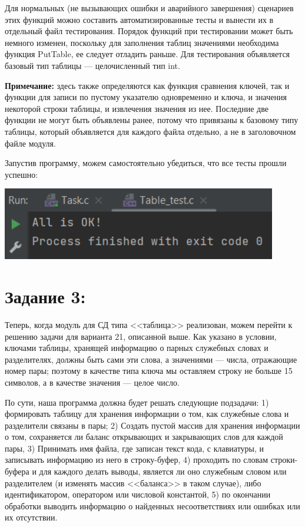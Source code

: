 \documentclass[12pt]{article}
\begin{document}
{	Для нормальных (не вызывающих ошибки и аварийного завершения) сценариев этих функций можно составить автоматизированные тесты и вынести их в отдельный файл тестирования. Порядок функций при тестировании может быть немного изменен, поскольку для заполнения таблиц значениями необходима функция PutTable, ее следует отладить раньше. Для тестирования объявляется базовый тип таблицы --- целочисленный тип int.
	
	{\bf Примечание: } здесь также определяются как функция сравнения ключей, так и функции для записи по пустому указателю одновременно и ключа, и значения некоторой строки таблицы, и извлечения значения из нее. Последние две функции не могут быть объявлены ранее, потому что привязаны к базовому типу таблицы, который объявляется для каждого файла отдельно, а не в заголовочном файле модуля.
	
	 
		
	Запустив программу, можем самостоятельно убедиться, что все тесты прошли успешно:
	
	\includegraphics[width=120mm]{images/table_test_output.png} 
	
	\section{Задание 3:}
	\label{task_3}
	
	Теперь, когда модуль для СД типа <<таблица>> реализован, можем перейти к решению задачи для варианта 21, описанной выше. Как указано в условии, ключами таблицы, хранящей информацию о парных служебных словах и разделителях, должны быть сами эти слова, а значениями --- числа, отражающие номер пары; поэтому в качестве типа ключа мы оставляем строку не больше 15 символов, а в качестве значения --- целое число. 
	
	По сути, наша программа должна будет решать следующие подзадачи: 1) формировать таблицу для хранения информации о том, как служебные слова и разделители связаны в пары; 2) Создать пустой массив для хранения информации о том, сохраняется ли баланс открывающих и закрывающих слов для каждой пары, 3) Принимать имя файла, где записан текст кода, с клавиатуры, и записывать информацию из него в строку-буфер, 4) проходить по словам строки-буфера и для каждого делать выводы, является ли оно служебным словом или разделителем (и изменять массив <<баланса>> в таком случае), либо идентификатором, оператором или числовой константой, 5) по окончании обработки выводить информацию о найденных несоответствиях или ошибках или их отсутствии.
	
}
\end{document}
